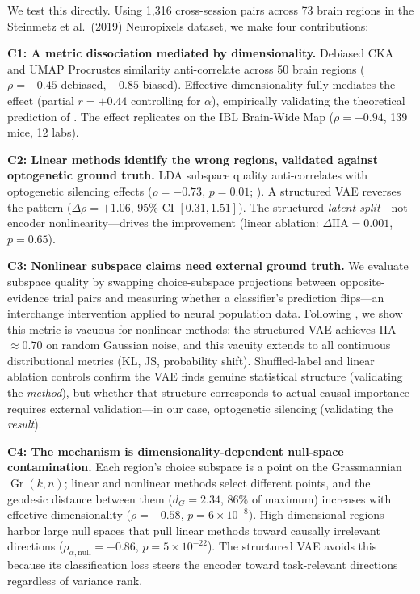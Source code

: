 \documentclass{article}
\begin{document}
We test this directly. Using 1,316 cross-session pairs across 73 brain regions in the Steinmetz et al.\ (2019) Neuropixels dataset, we make four contributions:

\textbf{C1: A metric dissociation mediated by dimensionality.}
Debiased CKA and UMAP Procrustes similarity anti-correlate across 50 brain regions ($\rho = -0.45$ debiased, $-0.85$ biased). Effective dimensionality fully mediates the effect (partial $r = +0.44$ controlling for $\alpha$), empirically validating the theoretical prediction of \citet{harvey2024representational}. The effect replicates on the IBL Brain-Wide Map ($\rho = -0.94$, 139 mice, 12 labs).

\textbf{C2: Linear methods identify the wrong regions, validated against optogenetic ground truth.}
LDA subspace quality anti-correlates with optogenetic silencing effects ($\rho = -0.73$, $p = 0.01$; \citealp{zatkahaas2021spatiotemporal}). A structured VAE reverses the pattern ($\Delta\rho = +1.06$, 95\% CI $[0.31, 1.51]$). The structured \emph{latent split}---not encoder nonlinearity---drives the improvement (linear ablation: $\Delta\text{IIA} = 0.001$, $p = 0.65$).

\textbf{C3: Nonlinear subspace claims need external ground truth.}
We evaluate subspace quality by swapping choice-subspace projections between opposite-evidence trial pairs and measuring whether a classifier's prediction flips---an interchange intervention \citep{geiger2024causal} applied to neural population data. Following \citet{sutter2025iia}, we show this metric is vacuous for nonlinear methods: the structured VAE achieves IIA $\approx 0.70$ on random Gaussian noise, and this vacuity extends to all continuous distributional metrics (KL, JS, probability shift). Shuffled-label and linear ablation controls confirm the VAE finds genuine statistical structure (validating the \emph{method}), but whether that structure corresponds to actual causal importance requires external validation---in our case, optogenetic silencing (validating the \emph{result}).

\textbf{C4: The mechanism is dimensionality-dependent null-space contamination.}
Each region's choice subspace is a point on the Grassmannian $\operatorname{Gr}(k, n)$; linear and nonlinear methods select different points, and the geodesic distance between them ($d_G = 2.34$, $86\%$ of maximum) increases with effective dimensionality ($\rho = -0.58$, $p = 6 \times 10^{-8}$). High-dimensional regions harbor large null spaces \citep{kaufman2014cortical} that pull linear methods toward causally irrelevant directions ($\rho_{\alpha,\text{null}} = -0.86$, $p = 5 \times 10^{-22}$). The structured VAE avoids this because its classification loss steers the encoder toward task-relevant directions regardless of variance rank.
\end{document}
